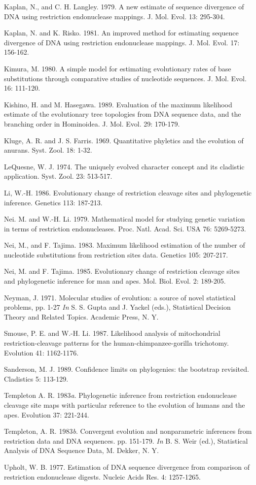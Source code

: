 {Kaplan, N., and  C. H. Langley.  1979.  A new estimate of sequence divergence
of DNA using restriction endonuclease mappings.  J. Mol. Evol. 13: 295-304.

Kaplan, N. and K. Risko. 1981.  An improved method for estimating sequence
divergence of DNA using restriction endonuclease mappings.  J. Mol. Evol.
 17: 156-162.

Kimura, M.  1980.  A simple model for estimating evolutionary rates of base
substitutions through comparative studies of nucleotide sequences.  J.
Mol. Evol.  16: 111-120.

Kishino, H. and M. Hasegawa.  1989. Evaluation of the maximum likelihood
estimate of the evolutionary tree topologies from DNA sequence data, and
the branching order in Hominoidea.  J. Mol. Evol.  29: 170-179.

Kluge, A. R. and J. S. Farris. 1969. Quantitative phyletics and the
evolution of anurans. Syst. Zool. 18: 1-32.

LeQuesne, W. J.  1974.  The uniquely evolved character concept and its
cladistic application.  Syst. Zool.  23: 513-517.

Li, W.-H. 1986.  Evolutionary change of restriction cleavage sites and
phylogenetic inference.  Genetics 113: 187-213.

Nei. M. and  W.-H. Li.  1979.  Mathematical model for studying genetic
variation in terms of restriction endonucleases.  Proc. Natl. Acad. Sci. USA  76: 5269-5273.

Nei, M., and F. Tajima.  1983.  Maximum likelihood estimation of the number of
nucleotide substitutions from restriction sites data.  Genetics  105: 207-217.

Nei, M. and F. Tajima.  1985.  Evolutionary change of restriction cleavage
sites and phylogenetic inference for man and apes.  Mol. Biol. Evol.
2: 189-205.

Neyman, J. 1971.  Molecular studies of evolution: a source of novel 
statistical problems, pp. 1-27 {\it In} S. S. Gupta and J. Yackel (eds.), Statistical Decision Theory and
Related Topics. Academic Press, N. Y.

Smouse, P. E. and W.-H. Li.  1987.  Likelihood analysis of mitochondrial
restriction-cleavage patterns for the human-chimpanzee-gorilla trichotomy.
Evolution  41: 1162-1176.

Sanderson, M. J. 1989.  Confidence limits on phylogenies: the bootstrap
revisited.  Cladistics 5: 113-129.

Templeton A. R.  1983{\it a}.  Phylogenetic inference from restriction endonuclease
cleavage site maps with particular reference to the evolution of humans and the
apes. Evolution  37: 221-244.

Templeton, A. R.  1983{\it b}. Convergent evolution and nonparametric
inferences from restriction data and DNA sequences.  pp. 151-179. {\it In} B. S. Weir (ed.), Statistical Analysis of DNA Sequence Data, 
M. Dekker, N. Y.

Upholt, W. B. 1977.  Estimation of DNA sequence divergence from comparison
of restriction endonuclease digests.  Nucleic Acids Res. 4: 1257-1265.
}
\newpage

